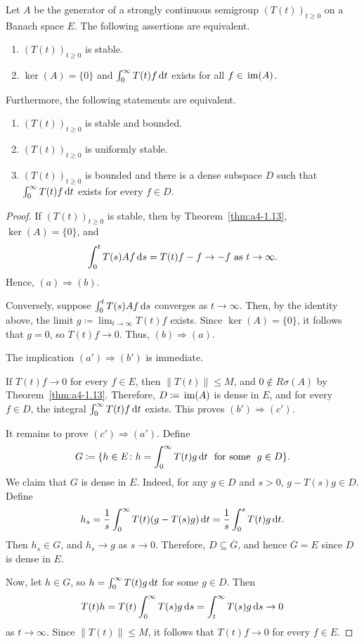 \begin{theorem}\label{thm:a4-1.16}
Let $A$ be the generator of a strongly continuous semigroup $(T(t))_{t \geq 0}$ on a Banach space $E$. 
The following assertions are equivalent.
\begin{enumerate}[\upshape (a)]
\item 
$(T(t))_{t \geq 0}$ is stable.

\item 
$\ker(A) = \{0\}$ and $\int_{0}^{\infty} T(t)f  \mathop{}\!\mathrm{d}{t}$ exists for all $f \in \mathop{}\mathrm{im}(A)$.

\end{enumerate}
Furthermore, the following statements are equivalent.
\begin{enumerate}[(a')]
\item $(T(t))_{t \geq 0}$ is stable and bounded.
\item $(T(t))_{t \geq 0}$ is uniformly stable.
\item $(T(t))_{t \geq 0}$ is bounded and there is a dense subspace $D$ such that $\int_{0}^{\infty} T(t)f  \mathop{}\!\mathrm{d}{t}$ exists for every $f \in D$.
\end{enumerate}
\end{theorem}
\begin{proof}
If\/ $(T(t))_{t \geq 0}$ is stable, then by Theorem~\ref{thm:a4-1.13}, $\ker(A) = \{0\}$, and
\[{
\int_{0}^{t} T(s)Af  \mathop{}\!\mathrm{d}{s} = T(t)f - f \to -f \ \text{as} \ t \to \infty .
}\]
Hence, $(a) \Rightarrow (b)$.

Conversely, suppose $\int_{0}^{t} T(s)Af  \mathop{}\!\mathrm{d}{s}$ converges as $t \to \infty$. Then, by
the identity above, the limit $g \coloneq \lim_{t \to \infty} T(t)f$ exists. 
Since $\ker(A) = \{0\}$, it follows that $g = 0$, so $T(t)f \to 0$. 
Thus, $(b) \Rightarrow (a)$.

The implication $(a') \Rightarrow (b')$ is immediate. 

If\/ $T(t)f \to 0$ for every $f \in E$, then $\|T(t)\| \leq M$, and $0 \not\in R\sigma(A)$ by Theorem~\ref{thm:a4-1.13}. 
Therefore,
$D \coloneq \mathop{}\mathrm{im}(A)$ is dense in $E$, and for every $f \in D$, the integral $\int_{0}^{\infty} T(t)f  \mathop{}\!\mathrm{d}{t}$ exists. 
This proves $(b') \Rightarrow (c')$. 

It remains to prove $(c') \Rightarrow (a')$.
Define 
\[
G \coloneq \{h \in E \colon h = \int_{0}^{\infty} T(t)g  \mathop{}\!\mathrm{d}{t} \ \text{ for some } \ g \in D\}.
\] 
We claim that $G$ is dense in $E$. 
Indeed, for any $g\in D$ and $s>0$,  $g - T(s)g \in D$.
Define 
%
\[
	h_{s} = \frac{1}{s} \int_{0}^{\infty} T(t)(g - T(s)g)  \mathop{}\!\mathrm{d}{t} = \frac{1}{s} \int_{0}^{s} T(t)g  \mathop{}\!\mathrm{d}{t} .
\]
%
Then $h_{s} \in G$, and $h_{s} \to g$ as $s \to 0$. 
Therefore, $D \subseteq \overline{G}$, and hence $\overline{G} = E$ since $D$ is dense in $E$. 

Now, let $h \in G$, so $h=\int_0^\infty T(t)g\mathop{}\!\mathrm{d}{t}$ for some $g\in D$.
Then %
\[
	T(t)h = T(t) \int_{0}^{\infty} T(s)g  \mathop{}\!\mathrm{d}{s} = \int_{t}^{\infty} T(s)g  \mathop{}\!\mathrm{d}{s} \to 0 
\]
%
as $t \to \infty$.
Since $\|T(t)\| \leq M$, it follows that   $T(t)f \to 0$ for every $f \in E$.
\end{proof}
